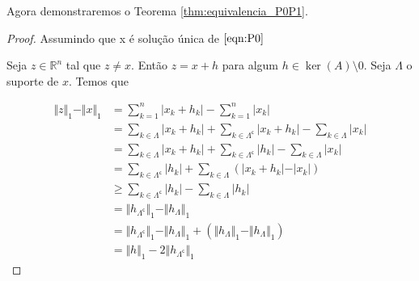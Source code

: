 

Agora demonstraremos o Teorema \ref{thm:equivalencia_P0P1}.
\begin{proof}

Assumindo que x é solução única de $\eqref{eqn:P0}$


Seja $z \in \mathbb{R}^n$ tal que $z \neq x$. Então $z = x + h$ para algum $h \in \ker(A) \setminus{0}$.
Seja $\Lambda$ o suporte de $x$. Temos que

\begin{subequations}
\begin{align*}
\Vert z \Vert_1 - \Vert x \Vert_1 &
= \sum_{k = 1}^n \vert x_k + h_k \vert - \sum_{k = 1}^n \vert x_k \vert \\
& = \sum_{k \in \Lambda} \vert x_k + h_k \vert +
\sum_{k \in \Lambda^{\mathsf{c}}} \vert x_k + h_k \vert
- \sum_{k \in \Lambda} \vert x_k \vert \\
& = \sum_{k \in \Lambda} \vert x_k + h_k \vert +
\sum_{k \in \Lambda^{\mathsf{c}}} \vert h_k \vert
- \sum_{k \in \Lambda} \vert x_k \vert \\
& = \sum_{k \in \Lambda^{\mathsf{c}}} \vert h_k \vert
+ \sum_{k \in \Lambda} \left( \vert x_k + h_k \vert - \vert x_k \vert \right) \\
& \geq \sum_{k \in \Lambda^{\mathsf{c}}} \vert h_k \vert
- \sum_{k \in \Lambda} \vert h_k \vert \\
& = \Vert h_{\Lambda^{\mathsf{c}}} \Vert_1 - \Vert h_\Lambda \Vert_1 \\
& = \Vert h_{\Lambda^{\mathsf{c}}} \Vert_1 - \Vert h_\Lambda \Vert_1 + (\Vert h_\Lambda \Vert_1 - \Vert h_\Lambda \Vert_1) \\
& = \Vert h \Vert_1 - 2 \Vert h_{\Lambda^\mathsf{c}} \Vert_1
\end{align*}
\end{subequations}



\end{proof}
